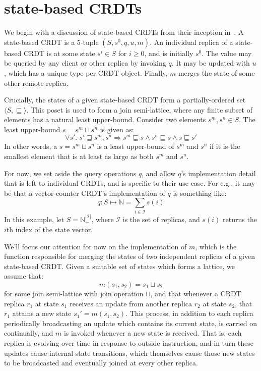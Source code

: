 \section{state-based CRDTs}
\label{sec:state-based-crdts}
We begin with a discussion of state-based CRDTs from their inception
in~\citep{shapiro11}. A state-based CRDT is a 5-tuple $(S, s^0, q, u, m)$. An
individual replica of a state-based CRDT is at some state $s^i \in S$ for $i \ge
0$, and is initially $s^0$. The value may be queried by any client or other
replica by invoking $q$. It may be updated with $u$, which has a unique type per
CRDT object. Finally, $m$ merges the state of some other remote replica.

Crucially, the states of a given state-based CRDT form a partially-ordered set
$\langle S, \sqsubseteq \rangle$. This poset is used to form a join
semi-lattice, where any finite subset of elements has a natural least
upper-bound. Consider two elements $s^m, s^n \in S$. The least upper-bound
$s = s^m \sqcup s^n$ is given as:
\[
  \forall s'.\; s' \sqsupseteq s^m, s^n \Rightarrow
    s^m \sqsubseteq s \land
    s^n \sqsubseteq s \land
    s \sqsubseteq s'
\]
In other words, a $s = s^m \sqcup s^n$ is a least upper-bound of $s^m$ and $s^n$
if it is the smallest element that is at least as large as both $s^m$ and $s^n$.

For now, we set aside the query operations $q$, and allow $q$'s implementation
detail that is left to individual CRDTs, and is specific to their use-case. For
e.g., it may be that a vector-counter CRDT's implementation of $q$ is
something like:
\[
  q : S \mapsto \mathbb{N} = \sum_{i \in \mathcal{I}} s(i)
\]
In this example, let $S = \mathbb{N}^{|\mathcal{I}|}_+$, where $\mathcal{I}$ is
the set of replicas, and $s(i)$ returns the $i$th index of the state vector.

We'll focus our attention for now on the implementation of $m$, which is the
function responsible for merging the states of two independent replicas of a
given state-based CRDT. Given a suitable set of states which forms a lattice, we
assume that:
\[
  m(s_1, s_2) = s_1 \sqcup s_2
\]
for some join semi-lattice with join operation $\sqcup$, and that whenever a
CRDT replica $r_1$ at state $s_1$ receives an update from another replica
$r_2$ at state $s_2$, that $r_1$ attains a new state $s_1' = m(s_1, s_2)$.
This process, in addition to each replica periodically broadcasting an update
which contains its current state, is carried on continually, and $m$ is
invoked whenever a new state is received. That is, each replica is evolving
over time in response to outside instruction, and in turn these updates cause
internal state transitions, which themselves cause those new states to be
broadcasted and eventually joined at every other replica.

